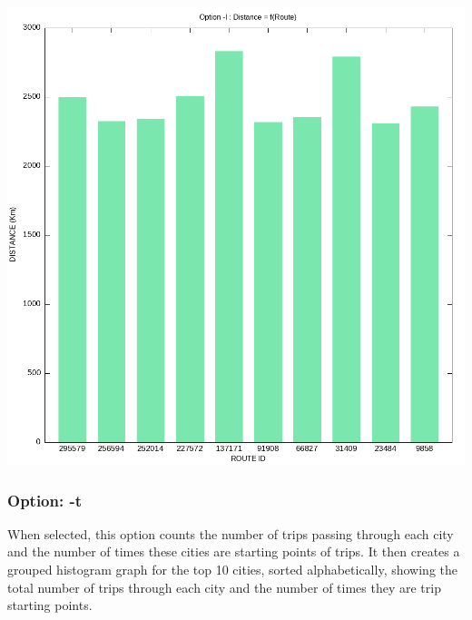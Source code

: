 \documentclass[11pt]{article}
\begin{document}
\vspace*{\fill}
\begin{center}
    \includegraphics[width=\textwidth]{l_graph.png}
\end{center}
\vspace*{\fill}

\newpage
\subsubsection*{Option: \color{blue}-t}
When selected, this option counts the number of trips passing through each city and the number of times these cities are starting points of trips. It then creates a grouped histogram graph for the top 10 cities, sorted alphabetically, showing the total number of trips through each city and the number of times they are trip starting points.
\end{document}
